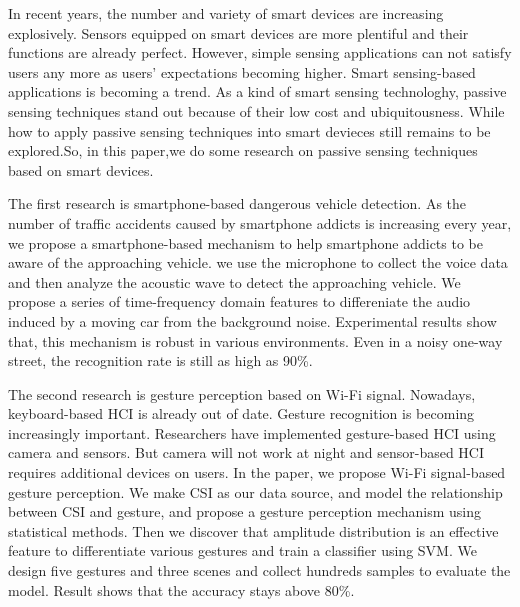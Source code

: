 \begin{eabstract}
In recent years, the number and variety of smart devices are increasing explosively. Sensors equipped on smart devices are more plentiful and their functions are already perfect. However, simple sensing applications can not satisfy users any more as users' expectations becoming higher. Smart sensing-based applications is becoming a trend. As a kind of smart sensing technologhy, passive sensing techniques stand out because of their low cost and ubiquitousness. While how to apply passive sensing techniques into smart devieces still remains to be explored.So, in this paper,we do some research on passive sensing techniques based on smart devices.

The first research is smartphone-based dangerous vehicle detection. As the number of traffic accidents caused by smartphone addicts is increasing every year, we propose a smartphone-based mechanism to help smartphone addicts to be aware of the approaching vehicle. we use the microphone to collect the voice data and then analyze the acoustic wave to detect the approaching vehicle. We propose a series of time-frequency domain features to differeniate the audio induced by a moving car from the background noise. Experimental results show that, this mechanism is robust in various environments. Even in a noisy one-way street, the recognition rate is still as high as 90\%.


The second research is gesture perception based on Wi-Fi signal. Nowadays, keyboard-based HCI is already out of date. Gesture recognition is becoming increasingly important. Researchers have implemented gesture-based HCI using camera and sensors. But camera will not work at night and sensor-based HCI requires additional devices on users. In the paper, we propose Wi-Fi signal-based gesture perception. We make CSI as our data source, and model the relationship between CSI and gesture, and propose a gesture perception mechanism using statistical methods. Then we discover that amplitude distribution is an effective feature to differentiate various gestures and train a classifier using SVM. We design five gestures and three scenes and collect hundreds samples to evaluate the model. Result shows that the accuracy stays above 80\%.

\end{eabstract}

